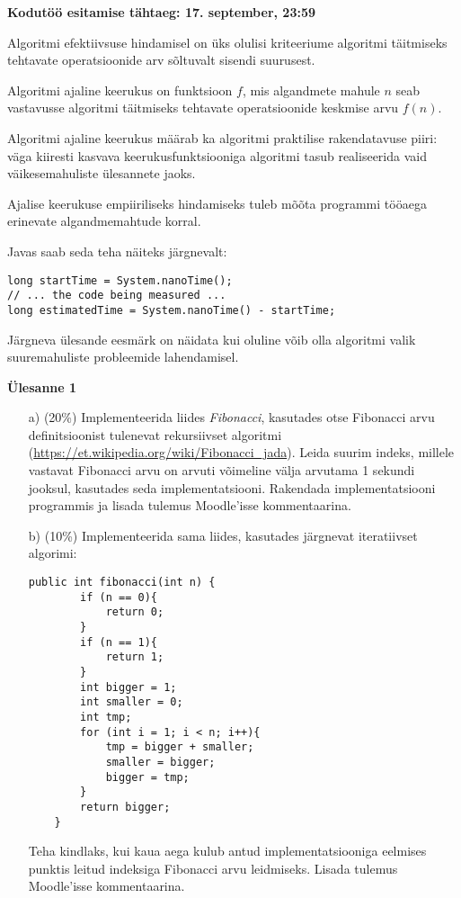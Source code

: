 \documentclass[a4paper]{article}
\begin{document}
\textbf{Kodutöö esitamise tähtaeg: 17. september, 23:59}

Algoritmi efektiivsuse hindamisel on üks olulisi kriteeriume algoritmi
täitmiseks tehtavate operatsioonide arv sõltuvalt sisendi suurusest.


Algoritmi ajaline keerukus on funktsioon $f$, mis algandmete
mahule $n$ seab vastavusse algoritmi täitmiseks tehtavate operatsioonide keskmise arvu $f(n)$. 

Algoritmi ajaline keerukus määrab ka algoritmi praktilise
rakendatavuse piiri: väga kiiresti kasvava keerukusfunktsiooniga
algoritmi tasub realiseerida vaid väikesemahuliste ülesannete jaoks.

Ajalise keerukuse empiiriliseks hindamiseks tuleb mõõta programmi tööaega erinevate algandmemahtude
korral.

Javas saab seda teha näiteks järgnevalt:

\begin{lstlisting}
long startTime = System.nanoTime();    
// ... the code being measured ...    
long estimatedTime = System.nanoTime() - startTime;
\end{lstlisting}

Järgneva ülesande eesmärk on näidata kui oluline võib olla algoritmi valik suuremahuliste probleemide lahendamisel.
\begin{problem}
\textbf{Ülesanne 1}
\begin{enumerate}
   \item[a)] (20\%) Implementeerida liides \textit{Fibonacci}, kasutades otse Fibonacci arvu definitsioonist tulenevat rekursiivset algoritmi (\url{https://et.wikipedia.org/wiki/Fibonacci_jada}). Leida suurim indeks, millele vastavat Fibonacci arvu on 
arvuti võimeline välja arvutama 1 sekundi jooksul, kasutades seda implementatsiooni. Rakendada implementatsiooni programmis ja lisada tulemus Moodle'isse kommentaarina. 
    \item[b)] (10\%) Implementeerida sama liides, kasutades järgnevat iteratiivset algorimi: 
\begin{lstlisting}
public int fibonacci(int n) {
        if (n == 0){
            return 0;
        }
        if (n == 1){
            return 1;
        }
        int bigger = 1;
        int smaller = 0;
        int tmp;
        for (int i = 1; i < n; i++){
            tmp = bigger + smaller;
            smaller = bigger;
            bigger = tmp;
        }
        return bigger;
    }
\end{lstlisting}
Teha kindlaks, kui kaua aega kulub antud implementatsiooniga eelmises punktis leitud indeksiga Fibonacci arvu leidmiseks. Lisada tulemus Moodle'isse kommentaarina.

\end{enumerate}

\end{problem}
\end{document}
